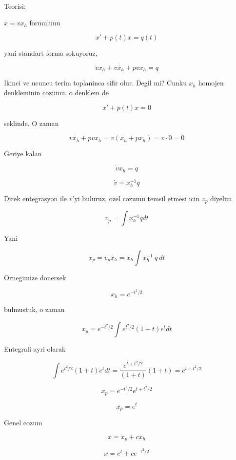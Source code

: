 \documentclass[12pt,fleqn]{article}\usepackage{../common}
\begin{document}
Teorisi:

$x=vx_h$ formulunu 

\[ x' + p(t)x = q(t) \]
 
yani standart forma sokuyoruz, 

\[ \dot{v}x_h + v\dot{x_h} + pvx_h = q \]

Ikinci ve ucuncu terim toplaninca sifir olur. Degil mi? Cunku $x_h$ homojen
denkleminin cozumu, o denklem de

\[ x' + p(t)x = 0 \]
 
seklinde. O zaman

\[ v\dot{x_h} + pvx_h = v(\dot{x_h} + px_h) = v \cdot 0 = 0 \]

Geriye kalan 

\[ \dot{v}x_h  = q \]

\[ \dot{v} = x_h^{-1} q \]

Direk entegrasyon ile $v$'yi buluruz, ozel cozumu temsil etmesi icin $v_p$
diyelim

\[ v_p = \int x_h^{-1} q dt\]

Yani 

\[ x_p = v_p x_h = x_h \int x_h^{-1} \ q \ dt \]

Ornegimize donersek

\[ x_h = e^{-t^2/2} \]
 
bulmustuk, o zaman 

\[ x_p =  e^{-t^2/2} \int e^{t^2/2} (1+t)e^t dt\]

Entegrali ayri olarak

\[ \int e^{t^2/2} (1+t)e^t dt  = 
\frac{e^{t+ t^2/2}}{(1+t)}{(1+t)} = 
e^{t+ t^2/2}
\]

\[ x_p =  e^{-t^2/2} e^{t+ t^2/2} \]

\[ x_p = e^t \]

Genel cozum 

\[ x = x_p + cx_h \]

\[ x = e^t + ce^{-t^2/2}  \]
\end{document}

